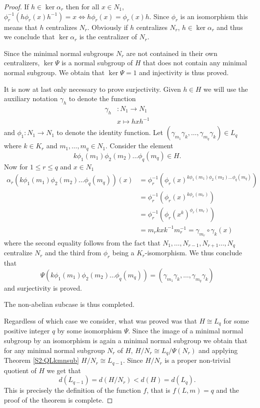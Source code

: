 \begin{proof}
If $h \in \ker \alpha_r$ then for all $x \in N_1$, $\phi_r^{-1}(h\phi_r(x)h^{-1}) = x \iff h\phi_r(x) = \phi_r(x)h$. Since $\phi_r$ is an isomorphism this means that $h$ centralizes $N_r$. Obviously if $h$ centralizes $N_r$, $h \in \ker \alpha_r$ and thus we conclude that $\ker \alpha_r$ is the centralizer of $N_r$. 

Since the minimal normal subgroups $N_r$ are not contained in their own centralizers, $\ker \Psi$ is a normal subgroup of $H$ that does not contain any minimal normal subgroup. 
We obtain that $\ker \Psi = 1$  and injectivity is thus proved.

It is now at last only necessary to prove surjectivity. Given $h \in H$ we will use the auxiliary notation $\gamma_h$ to denote the function
\begin{align*}
    \gamma_h &\colon N_1 \rightarrow N_1 \\
             &x \mapsto hxh^{-1}
\end{align*}
and $\phi_1 \colon N_1 \rightarrow N_1$ to denote the identity function.
Let $(\gamma_{m_1}\gamma_k,\ldots ,\gamma_{m_q}\gamma_k) \in L_q$ where $k \in K_r$ and $m_1,\ldots ,m_q \in N_1$. 
Consider the element $$k\phi_1(m_1)\phi_2(m_2)\ldots \phi_q(m_q) \in H.$$ 
Now for $1 \le r \le q$ and $x \in N_1$
\begin{align*}
    \alpha_r(k\phi_1(m_1)\phi_2(m_2)\ldots \phi_q(m_q))(x) &= \phi_r^{-1}(\phi_r(x)^{k\phi_1(m_1)\phi_2(m_2)\ldots \phi_q(m_q)}) \\
    &= \phi_r^{-1}(\phi_r(x)^{k\phi_r(m_r)}) \\
    &= \phi_r^{-1}(\phi_r(x^k)^{\phi_r(m_r)}) \\
    &= m_rkxk^{-1}m_r^{-1} = \gamma_{m_r} \circ \gamma_{k}(x)
\end{align*}
where the second equality follows from the fact that $N_1,\ldots ,N_{r-1},N_{r+1}\ldots ,N_q$ centralize $N_r$ and the third from $\phi_r$ being a $K_r$-isomorphism. We thus conclude that
$$
\Psi(k\phi_1(m_1)\phi_2(m_2)\ldots \phi_q(m_q)) = (\gamma_{m_1}\gamma_k,\ldots ,\gamma_{m_q}\gamma_k)
$$
and surjectivity is proved.

The non-abelian subcase is thus completed.

\vspace{2em}

Regardless of which case we consider, what was proved was that $H \cong L_q$ for some positive integer $q$ by some isomorphism $\Psi$. Since the image of a minimal normal subgroup by an isomorphism is again a minimal normal subgroup we obtain that for any minimal normal subgroup $N_r$ of $H$, $H/N_r \cong L_{q}/\Psi(N_r)$ and applying Theorem \ref{S2:QLkmnsub} $H/N_r \cong L_{q-1}$. Since $H/N_r$ is a proper non-trivial quotient of $H$ we get that
$$
d(L_{q-1}) = d(H/N_r) < d(H) = d(L_q).
$$
This is precisely the definition of the function $f$, that is $f(L,m) = q$ and the proof of the theorem is complete. 

\end{proof}